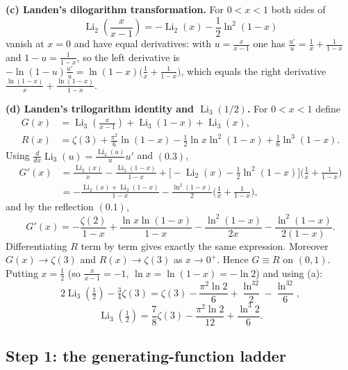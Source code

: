 \documentclass[11pt]{article}
\theoremstyle{remark}
\begin{document}
\textbf{(c) Landen's dilogarithm transformation.} For $0<x<1$ both sides of
\begin{equation}\operatorname{Li}_2\!\left(\frac{x}{x-1}\right)=-\operatorname{Li}_2(x)-\frac12\ln^2(1-x) \tag{0.3}\end{equation}
vanish at $x=0$ and have equal derivatives: with $u=\frac{x}{x-1}$ one has $\frac{u'}{u}=\frac1x+\frac1{1-x}$ and $1-u=\frac1{1-x}$, so the left derivative is $-\ln(1-u)\frac{u'}{u}=\ln(1-x)\big(\frac1x+\frac1{1-x}\big)$, which equals the right derivative $\frac{\ln(1-x)}{x}+\frac{\ln(1-x)}{1-x}$.

\textbf{(d) Landen's trilogarithm identity and $\operatorname{Li}_3(1/2)$.} For $0<x<1$ define
$$\begin{aligned}
G(x)&=\operatorname{Li}_3\!\left(\frac{x}{x-1}\right)+\operatorname{Li}_3(1-x)+\operatorname{Li}_3(x),\\
R(x)&=\zeta(3)+\frac{\pi^2}{6}\ln(1-x)-\frac12\ln x\ln^2(1-x)+\frac16\ln^3(1-x).
\end{aligned}$$
Using $\frac{d}{dx}\operatorname{Li}_3(u)=\frac{\operatorname{Li}_2(u)}{u}u'$ and $(0.3)$,
$$\begin{aligned}
G'(x)&=\frac{\operatorname{Li}_2(x)}{x}-\frac{\operatorname{Li}_2(1-x)}{1-x}
+\Big[-\operatorname{Li}_2(x)-\tfrac12\ln^2(1-x)\Big]\Big(\frac1x+\frac1{1-x}\Big)\\
&=-\frac{\operatorname{Li}_2(x)+\operatorname{Li}_2(1-x)}{1-x}-\frac{\ln^2(1-x)}{2}\Big(\frac1x+\frac1{1-x}\Big),
\end{aligned}$$
and by the reflection $(0.1)$,
$$G'(x)=-\frac{\zeta(2)}{1-x}+\frac{\ln x\ln(1-x)}{1-x}-\frac{\ln^2(1-x)}{2x}-\frac{\ln^2(1-x)}{2(1-x)} .$$
Differentiating $R$ term by term gives exactly the same expression. Moreover $G(x)\to\zeta(3)$ and $R(x)\to\zeta(3)$ as $x\to0^+$. Hence $G\equiv R$ on $(0,1)$. Putting $x=\tfrac12$ (so $\tfrac{x}{x-1}=-1$, $\ln x=\ln(1-x)=-\ln2$) and using (a):
$$2\operatorname{Li}_3\!\left(\tfrac12\right)-\tfrac34\zeta(3)=\zeta(3)-\frac{\pi^2\ln2}{6}+\frac{\ln^32}{2}-\frac{\ln^32}{6},$$
\begin{equation}\operatorname{Li}_3\!\left(\tfrac12\right)=\frac{7}{8}\zeta(3)-\frac{\pi^2\ln 2}{12}+\frac{\ln^3 2}{6}. \tag{0.4}\end{equation}

\subsection*{Step 1: the generating-function ladder}
\end{document}

